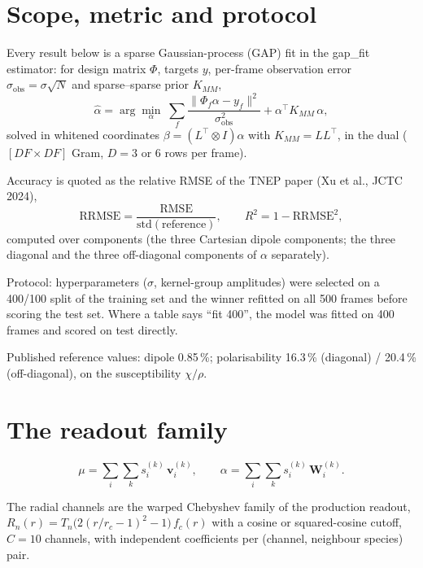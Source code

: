 \documentclass[11pt,a4paper]{article}
\begin{document}
\section{Scope, metric and protocol}\label{sec:scope}

Every result below is a sparse Gaussian-process (GAP) fit in the gap\_fit estimator: for design
matrix $\Phi$, targets $y$, per-frame observation error $\sigma_\mathrm{obs} = \sigma\sqrt{N}$
and sparse--sparse prior $K_{MM}$,
\begin{equation}
\hat\alpha = \arg\min_\alpha \; \sum_f \frac{\| \Phi_f\alpha - y_f\|^2}{\sigma_\mathrm{obs}^2} + \alpha^\top K_{MM}\,\alpha ,
\label{eq:gap-objective}
\end{equation}
solved in whitened coordinates $\beta = (L^\top\otimes I)\alpha$ with $K_{MM}=LL^\top$, in the
dual ($[DF\times DF]$ Gram, $D=3$ or $6$ rows per frame).

Accuracy is quoted as the relative RMSE of the TNEP paper (Xu et al., JCTC 2024),
\begin{equation}
\mathrm{RRMSE} = \frac{\mathrm{RMSE}}{\mathrm{std}(\mathrm{reference})},\qquad R^2 = 1-\mathrm{RRMSE}^2 ,
\label{eq:rrmse}
\end{equation}
computed over components (the three Cartesian dipole components; the three diagonal and the three
off-diagonal components of $\alpha$ separately).

Protocol: hyperparameters ($\sigma$, kernel-group amplitudes) were selected on a 400/100 split of
the training set and the winner refitted on all 500 frames before scoring the test set. Where a
table says ``fit 400'', the model was fitted on 400 frames and scored on test directly.

Published reference values: dipole 0.85\,\%; polarisability 16.3\,\% (diagonal) / 20.4\,\%
(off-diagonal), on the susceptibility $\chi/\rho$.

\section{The readout family}\label{sec:readout}

\begin{equation}
\mu = \sum_i \sum_k s^{(k)}_i\, \mathbf v^{(k)}_i, \qquad
\alpha = \sum_i \sum_k s^{(k)}_i\, \mathbf W^{(k)}_i .
\label{eq:readout}
\end{equation}

The radial channels are the warped Chebyshev family of the production readout,
$R_n(r) = T_n\big(2(r/r_c-1)^2-1\big)\,f_c(r)$ with a cosine or squared-cosine cutoff,
$C = 10$ channels, with independent coefficients per (channel, neighbour species) pair.
\end{document}
